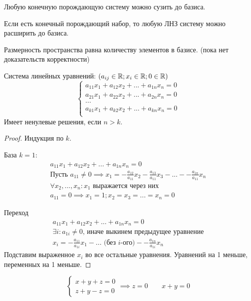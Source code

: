 \documentclass[main]{subfiles}
\begin{document}
\begin{remark}
    Любую конечную порождающую систему можно сузить до базиса.
\end{remark}
\begin{remark}
    Если есть конечный порождающий набор, то любую ЛНЗ систему можно расширить
    до базиса.
\end{remark}

\begin{definition}
    Размерность пространства равна количеству элементов в базисе.
    (пока нет доказательств корректности)
\end{definition}

\begin{lemma}
    Система линейных уравнений: $(a_{ij} \in \mathbb{R}; x_i \in \mathbb{R}; 0 \in \mathbb{R})$
    \begin{equation*}
        \begin{cases}
            a_{11} x_1 + a_{12}x_2 + ... + a_{1n} x_n = 0 \\
            a_{21} x_1 + a_{22}x_2 + ... + a_{2n} x_n = 0 \\
            ...                                           \\
            a_{k1} x_1 + a_{k2}x_2 + ... + a_{kn} x_n = 0 \\
        \end{cases}
    \end{equation*}
    Имеет ненулевые решения, если $n>k$.
\end{lemma}
\begin{proof}
    Индукция по $k$.

    База $k=1$:
    \begin{gather*}
        a_{11} x_1 + a_{12}x_2 + ... + a_{1n} x_n = 0\\
        \text{Пусть } a_{11} \neq 0 \implies x_1 = -\frac{a_{12}}{a_{11}}x_2
        -\frac{a_{13}}{a_{11}}x_3 - ... - -\frac{a_{1n}}{a_{11}}x_n\\
        \forall x_2,...,x_n: x_1 \text{ выражается через них}\\
        a_{11} = 0 \implies x_1 = 1; x_2=x_3=...=x_n=0
    \end{gather*}

    Переход
    \begin{gather*}
        a_{11} x_1 + a_{12}x_2 + ... + a_{1n} x_n = 0\\
        \exists i: a_{1i} \neq 0 \text{, иначе выкинем предыдущее уравнение}\\
        x_i = -\frac{a_{11}}{a_{1i}}x_1 - ...\text{ (без $i$-ого)} - -\frac{a_{1n}}{a_{1i}}x_n
    \end{gather*}
    Подставим выраженное $x_i$ во все остальные уравнения.
    Уравнений на 1 меньше, переменных на 1 меньше.
\end{proof}
\begin{example}
    \begin{equation*}
        \begin{cases}
            x+y+z=0 \\
            z+y-z=0
        \end{cases}
        \implies z=0 \qquad x+y=0
    \end{equation*}
\end{example}
\end{document}
